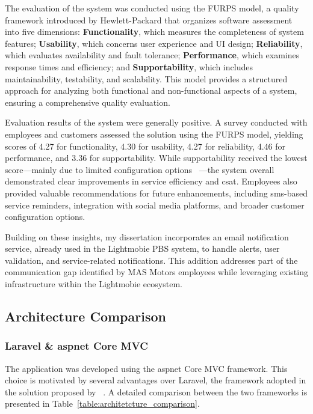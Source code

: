 The evaluation of the system was conducted using the \ac{FURPS} model, a quality framework introduced by Hewlett-Packard that organizes software assessment into five dimensions: \textbf{Functionality}, which measures the completeness of system features; \textbf{Usability}, which concerns user experience and \ac{UI} design; \textbf{Reliability}, which evaluates availability and fault tolerance; \textbf{Performance}, which examines response times and efficiency; and \textbf{Supportability}, which includes maintainability, testability, and scalability. This model provides a structured approach for analyzing both functional and non-functional aspects of a system, ensuring a comprehensive quality evaluation. ~\cite{furps,  furps2}

Evaluation results of the system were generally positive. A survey conducted with employees and customers assessed the solution using the \ac{FURPS} model, yielding scores of 4.27 for functionality, 4.30 for usability, 4.27 for reliability, 4.46 for performance, and 3.36 for supportability. While supportability received the lowest score—mainly due to limited configuration options ~\cite{MAS_MOTORS}—the system overall demonstrated clear improvements in service efficiency and \ac{csat}. Employees also provided valuable recommendations for future enhancements, including \ac{sms}-based service reminders, integration with social media platforms, and broader customer configuration options.

Building on these insights, my dissertation incorporates an email notification service, already used in the Lightmobie \acs{PBS} system, to handle alerts, user validation, and service-related notifications. This addition addresses part of the communication gap identified by MAS Motors employees while leveraging existing infrastructure within the Lightmobie ecosystem.

\subsection{Architecture Comparison}
  
\subsubsection{Laravel \& \ac{aspnet} Core \ac{MVC}}

The application was developed using the \ac{aspnet} Core \ac{MVC} framework. This choice is motivated by several advantages over Laravel, the framework adopted in the solution proposed by ~\citet{MAS_MOTORS}. A detailed comparison between the two frameworks is presented in Table~\ref{table:architetcture_comparison}.

